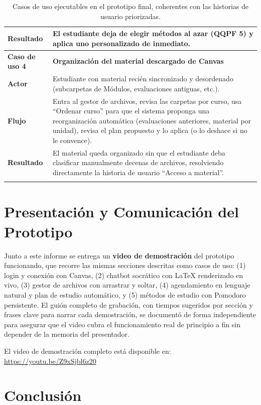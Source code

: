 \documentclass[11pt,a4paper]{article}
\begin{document}
\begin{longtable}{@{}>{\bfseries}p{3.6cm} p{11cm}@{}}
Resultado & El estudiante deja de elegir m\'etodos al azar (QQPF 5) y aplica uno personalizado de inmediato. \\
\midrule
\textbf{Caso de uso 4} & \textbf{Organizaci\'on del material descargado de Canvas} \\
\midrule
Actor & Estudiante con material reci\'en sincronizado y desordenado (subcarpetas de M\'odulos, evaluaciones antiguas, etc.). \\
Flujo & Entra al gestor de archivos, revisa las carpetas por curso, usa ``Ordenar curso'' para que el sistema proponga una reorganizaci\'on autom\'atica (evaluaciones anteriores, material por unidad), revisa el plan propuesto y lo aplica (o lo deshace si no le convence). \\
Resultado & El material queda organizado sin que el estudiante deba clasificar manualmente decenas de archivos, resolviendo directamente la historia de usuario ``Acceso a material''. \\
\bottomrule
\caption{Casos de uso ejecutables en el prototipo final, coherentes con las historias de usuario priorizadas.}
\end{longtable}

\section{Presentaci\'on y Comunicaci\'on del Prototipo}

Junto a este informe se entrega un \textbf{video de demostraci\'on} del prototipo funcionando, que recorre las mismas secciones descritas como casos de uso: (1) login y conexi\'on con Canvas, (2) chatbot socr\'atico con LaTeX renderizado en vivo, (3) gestor de archivos con arrastrar y soltar, (4) agendamiento en lenguaje natural y plan de estudio autom\'atico, y (5) m\'etodos de estudio con Pomodoro persistente. El gui\'on completo de grabaci\'on, con tiempos sugeridos por secci\'on y frases clave para narrar cada demostraci\'on, se document\'o de forma independiente para asegurar que el video cubra el funcionamiento real de principio a fin sin depender de la memoria del presentador.

El video de demostraci\'on completo est\'a disponible en: \url{https://youtu.be/Z9xSjbl6z20}

\section{Conclusi\'on}
\end{document}
